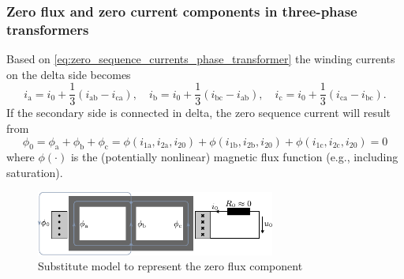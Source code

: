 \begin{frame}
	\frametitle{Zero flux and zero current components in three-phase transformers}
	Based on \eqref{eq:zero_sequence_currents_phase_transformer} the winding currents on the delta side becomes
	\begin{equation}		
			i_\mathrm{a} = i_0 + \frac{1}{3}\left(i_\mathrm{ab}-i_\mathrm{ca}\right), \quad i_\mathrm{b} = i_0 + \frac{1}{3}\left(i_\mathrm{bc}-i_\mathrm{ab}\right), \quad i_\mathrm{c} = i_0 + \frac{1}{3}\left(i_\mathrm{ca}-i_\mathrm{bc}\right).
	\end{equation} \pause
	If the secondary side is connected in delta, the zero sequence current will result from
	\begin{equation}
		\phi_0 = \phi_\mathrm{a} + \phi_\mathrm{b} + \phi_\mathrm{c}  = 
		\phi(i_{1\mathrm{a}}, i_{2\mathrm{a}}, i_{20}) + \phi(i_{1\mathrm{b}}, i_{2\mathrm{b}}, i_{20}) +\phi(i_{1\mathrm{c}}, i_{2\mathrm{c}}, i_{20}) =0
	\end{equation}
	where $\phi(\cdot)$ is the (potentially nonlinear) magnetic flux function (e.g., including saturation). \pause
	\begin{figure}
		\includegraphics[width=0.7\textwidth]{fig/lec04/Zero_flux_model.pdf}
		\caption{Substitute model to represent the zero flux component}
		\label{fig:Zero_flux_model}
	\end{figure}
\end{frame}


